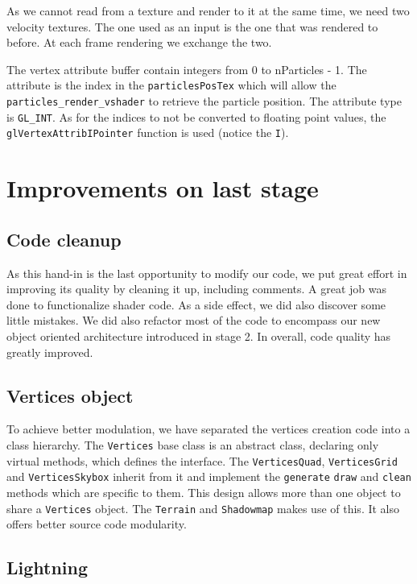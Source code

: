 \documentclass[a4paper,11pt]{article}
\begin{document}
As we cannot read from a texture and render to it at the same time, we need two velocity textures. The one used as an input is the one that was rendered to before. At each frame rendering we exchange the two.

The vertex attribute buffer contain integers from 0 to nParticles - 1. The attribute is the index in the \texttt{particlesPosTex} which will allow the \texttt{particles\_render\_vshader} to retrieve the particle position. The attribute type is \texttt{GL\_INT}. As for the indices to not be converted to floating point values, the \texttt{glVertexAttribIPointer} function is used (notice the \texttt{I}).

\section{Improvements on last stage}

\subsection{Code cleanup}

As this hand-in is the last opportunity to modify our code, we put great effort in improving its quality by cleaning it up, including comments. A great job was done to functionalize shader code. As a side effect, we did also discover some little mistakes. We did also refactor most of the code to encompass our new object oriented architecture introduced in stage 2. In overall, code quality has greatly improved.

\subsection{Vertices object}

To achieve better modulation, we have separated the vertices creation code into a class hierarchy. The \texttt{Vertices} base class is an abstract class, declaring only virtual methods, which defines the interface. The \texttt{VerticesQuad}, \texttt{VerticesGrid} and \texttt{VerticesSkybox} inherit from it and implement the \texttt{generate} \texttt{draw} and \texttt{clean} methods which are specific to them. This design allows more than one  object to share a \texttt{Vertices} object. The \texttt{Terrain} and \texttt{Shadowmap} makes use of this. It also offers better source code modularity.

\subsection{Lightning}
\end{document}
